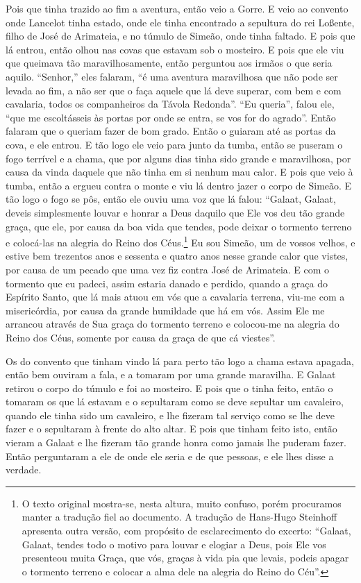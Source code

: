 Pois que tinha trazido ao fim a aventura, então veio a Gorre. E veio ao convento
onde Lancelot tinha estado, onde ele tinha encontrado a sepultura do rei
Loßente, filho de José de Arimateia, e no túmulo de Simeão, onde tinha faltado.
E pois que lá entrou, então olhou nas covas que estavam sob o mosteiro. E pois
que ele viu que queimava tão maravilhosamente, então perguntou aos irmãos o que
seria aquilo. “Senhor,” eles falaram, “é uma aventura maravilhosa que não pode
ser levada ao fim, a não ser que o faça aquele que lá deve superar, com bem e
com cavalaria, todos os companheiros da Távola Redonda”. “Eu queria”, falou
ele, “que me escoltásseis às portas por onde se entra, se vos for do agrado”.
Então falaram que o queriam fazer de bom grado. Então o guiaram até as portas
da cova, e ele entrou. E tão logo ele veio para junto da tumba, então se
puseram o fogo terrível e a chama, que por alguns dias tinha sido grande e
maravilhosa, por causa da vinda daquele que não tinha em si nenhum mau calor. E
pois que veio à tumba, então a ergueu contra o monte e viu lá dentro jazer o
corpo de Simeão. E tão logo o fogo se pôs, então ele ouviu uma voz que lá
falou: “Galaat, Galaat, deveis simplesmente louvar e honrar a Deus daquilo que
Ele vos deu tão grande graça, que ele, por causa da boa vida que tendes, pode
deixar o tormento terreno e colocá-las na alegria do Reino dos Céus.\footnote{
O texto original mostra-se, nesta altura, muito confuso, porém procuramos
manter a tradução fiel ao documento. A tradução de Hans-Hugo Steinhoff
apresenta outra versão, com propósito de esclarecimento do excerto: “Galaat,
Galaat, tendes todo o motivo para louvar e elogiar a Deus, pois Ele vos
presenteou muita Graça, que vós, graças à vida pia que levais, podeis apagar o
tormento terreno e colocar a alma dele na alegria do Reino do Céu”.} 
Eu sou Simeão, um de vossos velhos, e estive bem trezentos anos e sessenta e
quatro anos nesse grande calor que vistes, por causa de um pecado que uma vez
fiz contra José de Arimateia. E com o tormento que eu padeci, assim estaria
danado e perdido, quando a graça do Espírito Santo, que lá mais atuou em vós
que a cavalaria terrena, viu-me com a misericórdia, por causa da grande
humildade que há em vós. Assim Ele me arrancou através de Sua graça do tormento
terreno e colocou-me na alegria do Reino dos Céus, somente por causa da graça
de que cá viestes”.

Os do convento que tinham vindo lá para perto tão logo a chama estava apagada,
então bem ouviram a fala, e a tomaram por uma grande maravilha. E Galaat
retirou o corpo do túmulo e foi ao mosteiro. E pois que o tinha feito, então o
tomaram os que lá estavam e o sepultaram como se deve sepultar um cavaleiro,
quando ele tinha sido um cavaleiro, e lhe fizeram tal serviço como se lhe deve
fazer e o sepultaram à frente do alto altar. E pois que tinham feito
isto, então vieram a Galaat e lhe fizeram tão grande honra como jamais lhe
puderam fazer. Então perguntaram a ele de onde ele seria e de que
pessoas, e ele lhes disse a verdade.

